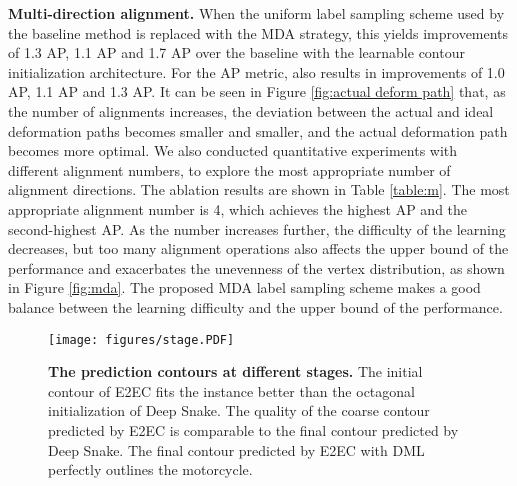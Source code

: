 \documentclass[10pt,twocolumn,letterpaper]{article}
\begin{document}
\textbf{Multi-direction alignment.} When the uniform label sampling scheme used by the baseline method is replaced with the MDA strategy, this yields improvements of 1.3 AP, 1.1 AP and 1.7 AP over the baseline with the learnable contour initialization architecture. For the AP metric, also results in improvements of 1.0 AP, 1.1 AP and 1.3 AP. It can be seen in Figure \ref{fig:actual deform path} that, as the number of alignments increases, the deviation between the actual and ideal deformation paths becomes smaller and smaller, and the actual deformation path becomes more optimal. We also conducted quantitative experiments with different alignment numbers, to explore the most appropriate number of alignment directions. The ablation results are shown in Table \ref{table:m}. The most appropriate alignment number is 4, which achieves the highest AP and the second-highest AP. As the number increases further, the difficulty of the learning decreases, but too many alignment operations also affects the upper bound of the performance and exacerbates the unevenness of the vertex distribution, as shown in Figure \ref{fig:mda}. The proposed MDA label sampling scheme makes a good balance between the learning difficulty and the upper bound of the performance.
\begin{figure*}[t]
  \centering
\begin{small}
\vspace{-1mm}\texttt{[image: figures/stage.PDF]}\vspace{-3mm}
   \caption{\textbf{The prediction contours at different stages.} The initial contour of E2EC fits the instance better than the octagonal initialization of Deep Snake. The quality of the coarse contour predicted by E2EC is comparable to the final contour predicted by Deep Snake. The final contour predicted by E2EC with DML perfectly outlines the motorcycle.}
   \label{fig:stage}\vspace{-4mm}
\end{small}
\end{figure*}
\end{document}
